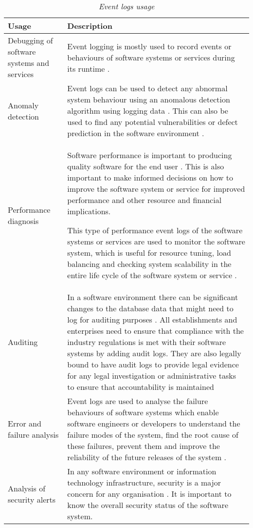 \begin{table}[!htb]
	\centering
	\caption[Event logs usage]
	{\textit{Event logs usage}}
	\label{tbl:ch1_eventLogsUsage}
	\begin{tabularx}{\textwidth}{|l|X|}
		\hline \textbf{Usage} & \textbf{Description} \\
		\hline Debugging of software systems and services & Event logging is mostly used to record events or behaviours of software systems or services during its runtime \cite{Rong2018a}.\\
		\hline Anomaly detection & Event logs can be used to detect any abnormal system behaviour using an anomalous detection algorithm using logging data \cite{Gurumdimma2016}. This can also be used to find any potential vulnerabilities or defect prediction in the software environment \cite{Dwyer2013}. \\
		\hline Performance diagnosis & Software performance is important to producing quality software for the end user \cite{EvangelinGeetha2007, Baccanico2014}. This is also important to make informed decisions on how to improve the software system or service for improved performance and other resource and financial implications.\par This type of performance event logs of the software systems or services are used to monitor the software system, which is useful for resource tuning, load balancing and checking system scalability in the entire life cycle of the software system or service \cite{Song2017}. \\ 
		\hline Auditing & In a software environment there can be significant changes to the database data that might need to log for auditing purposes \cite{Rong2018a}. All establishments and enterprises need to ensure that compliance with the industry regulations is met with their software systems by adding audit logs. They are also legally bound to have audit logs to provide legal evidence for any legal investigation or administrative tasks to ensure that accountability is maintained \\
		\hline Error and failure analysis & Event logs are used to analyse the failure behaviours of software systems which enable software engineers or developers to understand the failure modes of the system, find the root cause of these failures, prevent them and improve the reliability of the future releases of the system \cite{Cinque2013}.\\
		\hline Analysis of security alerts & In any software environment or information technology infrastructure, security is a major concern for any organisation \cite{Pathan2014, Dwyer2013}. It is important to know the overall security status of the software system. \\
		\hline
	\end{tabularx}
\end{table}

